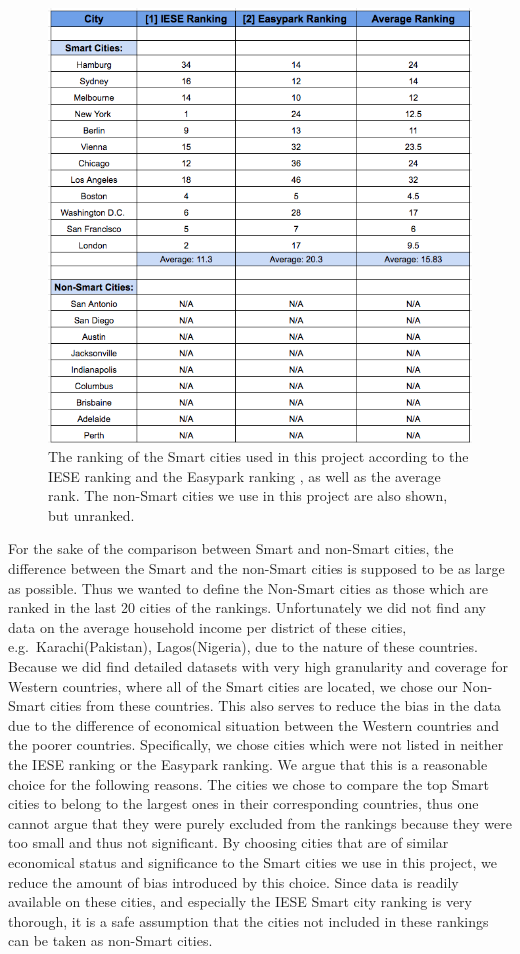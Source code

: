\documentclass[a4paper, 10pt]{IEEEconf}      %
\begin{document}
\begin{figure}
	\centering{}
	\includegraphics[scale=0.5]{rankings.png}
	\caption{The ranking of the Smart cities used in this project according to the IESE ranking \cite{c1} and the Easypark ranking \cite{c1}, as well as the average rank. The non-Smart cities we use in this project are also shown, but unranked.}
	\label{fig:ranking}
\end{figure}

For the sake of the comparison between Smart and non-Smart cities, the difference between the Smart and the non-Smart cities is supposed to be as large as possible.
Thus we wanted to define the Non-Smart cities as those which are ranked in the last 20 cities of the rankings. 
Unfortunately we did not find any data on the average household income per district of these cities, e.g.\ Karachi(Pakistan), Lagos(Nigeria), due to the nature of these countries.
Because we did find detailed datasets with very high granularity and coverage
for Western countries, where all of the Smart cities are located, we chose our Non-Smart cities from these countries. This also serves to reduce the bias in the data due to the difference of economical situation between the Western countries and the poorer countries.
Specifically, we chose cities which were not listed in neither the IESE ranking or the Easypark ranking. We argue that this is a reasonable choice for the following reasons. The
cities we chose to compare the top Smart cities to belong to the largest ones in their corresponding countries, thus one cannot argue that they were purely excluded
from the rankings because they were too small and thus not significant. By choosing cities that are of similar economical status and significance to the Smart cities we use in this project, we reduce the amount of bias introduced by this choice.
Since data is readily available on these cities, and especially the IESE Smart city ranking is very thorough, it is a safe assumption that the cities not included in these rankings can be taken as non-Smart cities. 
\end{document}
